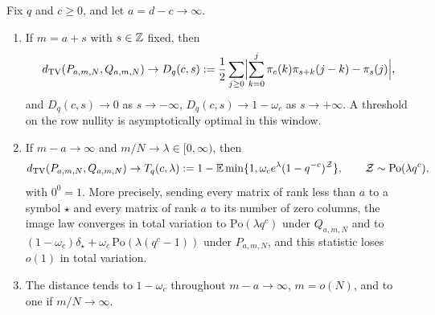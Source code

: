 \begin{theorem}\label{spn:thm:anchors-codim}
Fix $q$ and $c\ge0$, and let $a=d-c\to\infty$.
\begin{enumerate}
\item If $m=a+s$ with $s\in\mathbb{Z}$ fixed, then
\[
 d_{\mathrm{TV}}(P_{a,m,N},Q_{a,m,N})\to D_q(c,s):=\frac12\sum_{j\ge0}\Bigl|\sum_{k=0}^j\pi_c(k)\pi_{s+k}(j-k)-\pi_s(j)\Bigr|,
\]
and $D_q(c,s)\to0$ as $s\to-\infty$, $D_q(c,s)\to1-\omega_c$ as $s\to+\infty$. A threshold on the row
nullity is asymptotically optimal in this window.
\item If $m-a\to\infty$ and $m/N\to\lambda\in[0,\infty)$, then
\[
 d_{\mathrm{TV}}(P_{a,m,N},Q_{a,m,N})\to T_q(c,\lambda):=1-\mathbb{E}\min\{1,\omega_ce^\lambda(1-q^{-c})^{\mathcal Z}\},
 \qquad\mathcal Z\sim\mathrm{Po}(\lambda q^c),
\]
with $0^0=1$. More precisely, sending every matrix of rank less than $a$ to a symbol $\star$ and every
matrix of rank $a$ to its number of zero columns, the image law converges in total variation to
$\mathrm{Po}(\lambda q^c)$ under $Q_{a,m,N}$ and to $(1-\omega_c)\delta_\star+\omega_c\,\mathrm{Po}(\lambda(q^c-1))$
under $P_{a,m,N}$, and this statistic loses $o(1)$ in total variation.
\item The distance tends to $1-\omega_c$ throughout $m-a\to\infty$, $m=o(N)$, and to one if $m/N\to\infty$.
\end{enumerate}
\end{theorem}

